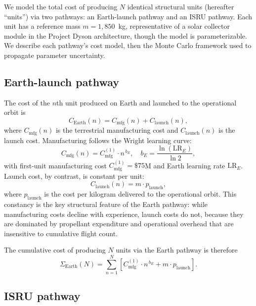 \documentclass[preprint,12pt]{elsarticle}
\begin{document}
We model the total cost of producing $N$ identical structural units (hereafter ``units'') via two pathways: an Earth-launch pathway and an ISRU pathway. Each unit has a reference mass $m = 1{,}850$~kg, representative of a solar collector module in the Project Dyson architecture, though the model is parameterizable. We describe each pathway's cost model, then the Monte Carlo framework used to propagate parameter uncertainty.

\subsection{Earth-launch pathway}

The cost of the $n$th unit produced on Earth and launched to the operational orbit is
\begin{equation}
  C_{\mathrm{Earth}}(n) = C_{\mathrm{mfg}}(n) + C_{\mathrm{launch}}(n),
  \label{eq:earth_unit}
\end{equation}
where $C_{\mathrm{mfg}}(n)$ is the terrestrial manufacturing cost and $C_{\mathrm{launch}}(n)$ is the launch cost. Manufacturing follows the Wright learning curve:
\begin{equation}
  C_{\mathrm{mfg}}(n) = C_{\mathrm{mfg}}^{(1)} \cdot n^{\,b_E}, \quad b_E = \frac{\ln(\mathrm{LR}_E)}{\ln 2},
  \label{eq:earth_mfg}
\end{equation}
with first-unit manufacturing cost $C_{\mathrm{mfg}}^{(1)} = \$75$M and Earth learning rate $\mathrm{LR}_E$. Launch cost, by contrast, is constant per unit:
\begin{equation}
  C_{\mathrm{launch}}(n) = m \cdot p_{\mathrm{launch}},
  \label{eq:earth_launch}
\end{equation}
where $p_{\mathrm{launch}}$ is the cost per kilogram delivered to the operational orbit. This constancy is the key structural feature of the Earth pathway: while manufacturing costs decline with experience, launch costs do not, because they are dominated by propellant expenditure and operational overhead that are insensitive to cumulative flight count.

The cumulative cost of producing $N$ units via the Earth pathway is therefore
\begin{equation}
  \Sigma_{\mathrm{Earth}}(N) = \sum_{n=1}^{N} \left[ C_{\mathrm{mfg}}^{(1)} \cdot n^{\,b_E} + m \cdot p_{\mathrm{launch}} \right].
  \label{eq:earth_cum}
\end{equation}

\subsection{ISRU pathway}
\end{document}
